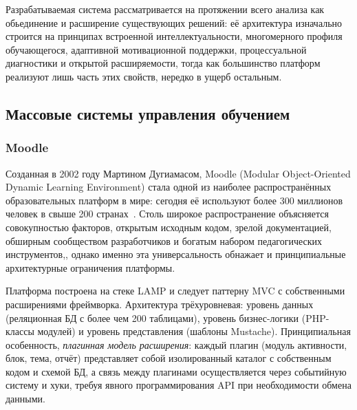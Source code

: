 Разрабатываемая система рассматривается на протяжении
всего анализа как обьединение и расширение существующих решений: её архитектура
изначально строится на принципах встроенной интеллектуальности,
многомерного профиля обучающегося, адаптивной мотивационной
поддержки, процессуальной диагностики и открытой расширяемости,
тогда как большинство платформ реализуют лишь часть этих
свойств, нередко в ущерб остальным.

\subsection{Массовые системы управления обучением}

\subsubsection{Moodle}

Созданная в 2002 году Мартином Дугиамасом, Moodle (Modular
Object-Oriented Dynamic Learning Environment) стала одной из
наиболее распространённых образовательных платформ в мире:
сегодня её используют более 300 миллионов человек в свыше
200 странах~\cite{moodle2026official, review_elearning_2016}.
Столь широкое распространение объясняется совокупностью
факторов, открытым исходным кодом, зрелой документацией,
обширным сообществом разработчиков и богатым набором
педагогических инструментов,, однако именно эта универсальность
обнажает и принципиальные архитектурные ограничения платформы.

Платформа построена на стеке LAMP и следует паттерну MVC
с собственными расширениями фреймворка. Архитектура
трёхуровневая: уровень данных (реляционная БД с более чем
200 таблицами), уровень бизнес-логики (PHP-классы модулей)
и уровень представления (шаблоны Mustache). Принципиальная
особенность, \textit{плагинная модель расширения}: каждый
плагин (модуль активности, блок, тема, отчёт) представляет
собой изолированный каталог с собственным кодом и схемой
БД, а связь между плагинами осуществляется через событийную
систему и хуки, требуя явного программирования API при
необходимости обмена данными.


